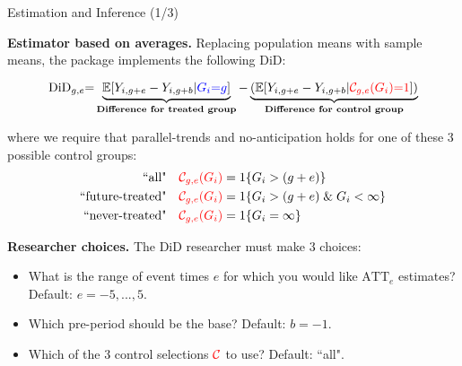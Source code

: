 \documentclass[usenames,dvipsnames]{beamer}
\begin{document}
\begin{frame}{Estimation and Inference (1/3)}



\textbf{Estimator based on averages.} Replacing population means with sample means, the package  implements the following DiD:

\vspace{-0.55cm}

\begin{equation} \notag  
\textrm{DiD}_{g,e} 
{=}
\underbrace{ \mathbb{E}[Y_{i,g+e} - Y_{i,g+b}  | {\color{blue} G_i {=} g} ] }_{\textbf{Difference for treated group}}
{-} \underbrace{
\left(
  \mathbb{E}[Y_{i,g+e} - Y_{i,g+b} | {\color{red} \mathcal{C}_{g,e}(G_i) {=} 1}]      
\right) 
  }_{\textbf{Difference for control group}}  
\end{equation}
 
\vspace{-0.2cm}

where  we require that parallel-trends and no-anticipation holds for one of these 3 possible control groups:
\begin{equation} \notag
\begin{aligned}
\text{``all"} & \quad {\color{red} \mathcal{C}_{g,e}(G_i)} = 
1\{ G_i > (g+e) \} \\
\text{``future-treated"} & \quad {\color{red} \mathcal{C}_{g,e}(G_i)} = 
1\{ G_i > (g+e) \; \& \; G_i < \infty \} \\
\text{``never-treated"} & \quad {\color{red} \mathcal{C}_{g,e}(G_i)} = 
1\{  G_i = \infty \}
\end{aligned}
\end{equation}

\vspace{-0.05cm} 

\textbf{Researcher choices.} The DiD researcher must make 3 choices:
\vspace{-0.1cm}
\begin{itemize}
\item[\textbf{1.}] What is the range of event times $e$  for which you would like $\text{ATT}_e$ estimates? Default: $e=-5,...,5$.
\item[\textbf{2.}] Which pre-period should be the base? Default: $b=-1$.
\item[\textbf{3.}] Which of the 3 control selections ${\color{red} \mathcal{C}}$ to use? Default: ``all".
\end{itemize}


\end{frame}
\end{document}
